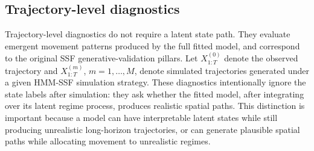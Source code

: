 \documentclass[11pt]{article}
\begin{document}
\subsection{Trajectory-level diagnostics}

Trajectory-level diagnostics do not require a latent state path. They evaluate
emergent movement patterns produced by the full fitted model, and correspond
to the original SSF generative-validation pillars. Let
$X_{1:T}^{(0)}$ denote the observed trajectory and
$X_{1:T}^{(m)}$, $m=1,\ldots,M$, denote simulated trajectories generated under
a given HMM-SSF simulation strategy. These diagnostics intentionally ignore the
state labels after simulation: they ask whether the fitted model, after
integrating over its latent regime process, produces realistic spatial paths.
This distinction is important because a model can have interpretable latent
states while still producing unrealistic long-horizon trajectories, or can
generate plausible spatial paths while allocating movement to unrealistic
regimes.
\end{document}
